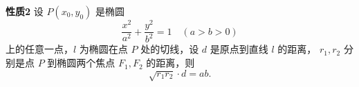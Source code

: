 \documentclass[12pt]{ctexart}
\begin{document}
\textbf{性质2}\quad
设 $P(x_0,y_0)$ 是椭圆
\[
\frac{x^2}{a^2}+\frac{y^2}{b^2}=1 \quad (a>b>0)
\]
上的任意一点，$l$ 为椭圆在点 $P$ 处的切线，设 $d$ 是原点到直线 $l$ 的距离，
$r_1,r_2$ 分别是点 $P$ 到椭圆两个焦点 $F_1,F_2$ 的距离，则
\[
\sqrt{r_1r_2}\cdot d = ab.
\]
\end{document}
